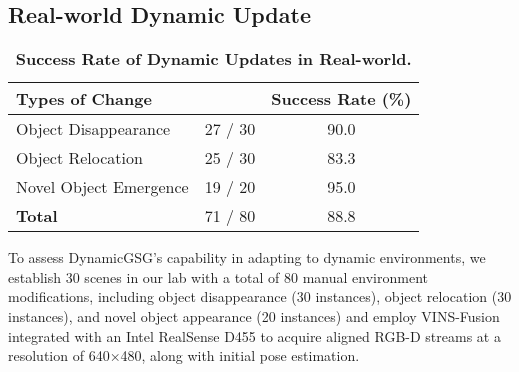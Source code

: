 


\subsection{Real-world Dynamic Update}
\label{subsec:real_world}


\begin{table}[!t]
    \centering
    \begin{tabular}{lcc}\toprule
\multirow{1}{*}{\textbf{Types of Change}}      &            & \textbf{Success Rate (\%)}  \\ \midrule 

Object Disappearance      & 27 / 30              & 90.0  \\

Object Relocation & 25 / 30                     & 83.3      \\

Novel Object Emergence  & 19 / 20             & 95.0       \\
\midrule
\textbf{Total}   & 71 / 80                  & 88.8              \\
 \bottomrule
\end{tabular}
    \caption{\textbf{Success Rate of Dynamic Updates in Real-world.}}
    \label{tab:changes}
    \vspace{-2em}
\end{table}

To assess DynamicGSG's capability in adapting to dynamic environments, we establish 30 scenes in our lab with a total of 80 manual environment modifications, including object disappearance (30 instances), object relocation (30 instances), and novel object appearance (20 instances) and employ VINS-Fusion \cite{qin2019a} integrated with an Intel RealSense D455 to acquire aligned RGB-D streams at a resolution of 640×480, along with initial pose estimation.

